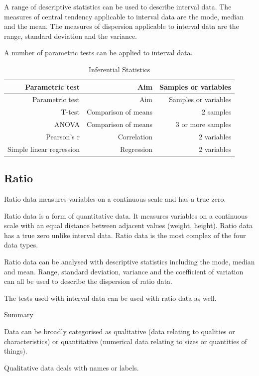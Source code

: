 \documentclass[
]{book}
\begin{document}
A range of descriptive statistics can be used to describe interval data. The measures of central tendency applicable to interval data are the mode, median and the mean. The measures of dispersion applicable to interval data are the range, standard deviation and the variance.

A number of parametric tests can be applied to interval data.

\begin{longtable}[]{@{}rrr@{}}
\caption{\label{tab:table1}Inferential Statistics}\tabularnewline
\toprule
Parametric test & Aim & Samples or variables \\
\midrule
\endfirsthead
\toprule
Parametric test & Aim & Samples or variables \\
\midrule
\endhead
T-test & Comparison of means & 2 samples \\
ANOVA & Comparison of means & 3 or more samples \\
Pearson's r & Correlation & 2 variables \\
Simple linear regression & Regression & 2 variables \\
\bottomrule
\end{longtable}

\hypertarget{ratio}{%
\subsection{Ratio}\label{ratio}}

Ratio data measures variables on a continuous scale and has a true zero.

Ratio data is a form of quantitative data. It measures variables on a continuous scale with an equal distance between adjacent values (weight, height). Ratio data has a true zero unlike interval data. Ratio data is the most complex of the four data types.

Ratio data can be analysed with descriptive statistics including the mode, median and mean. Range, standard deviation, variance and the coefficient of variation can all be used to describe the dispersion of ratio data.

The tests used with interval data can be used with ratio data as well.

Summary

Data can be broadly categorised as qualitative (data relating to qualities or characteristics) or quantitative (numerical data relating to sizes or quantities of things).

Qualitative data deals with names or labels.
\end{document}
